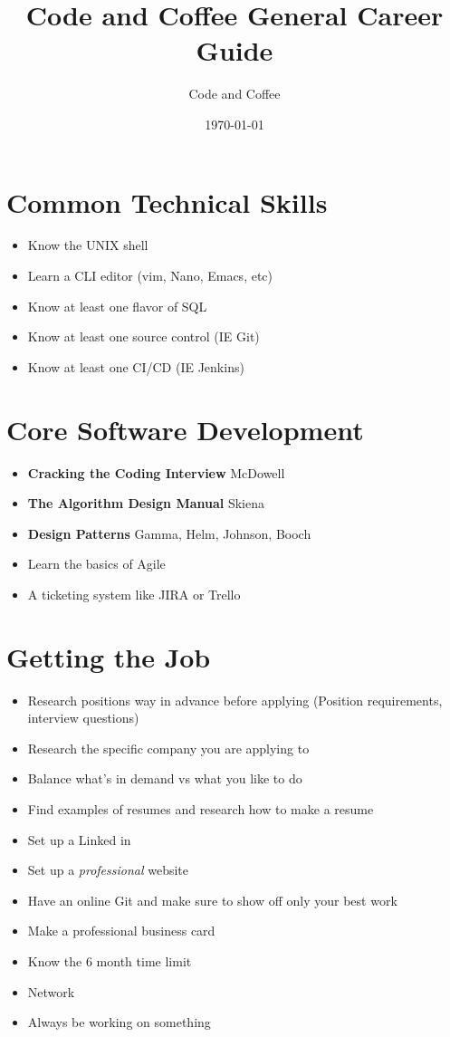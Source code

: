 \documentclass[12pt]{article}
\title{Code and Coffee General Career Guide}
\author{Code and Coffee}
\date{\today}
\begin{document}
\maketitle

\section{Common Technical Skills}
\begin{itemize}
\item Know the UNIX shell
\item Learn a CLI editor (vim, Nano, Emacs, etc)
\item Know at least one flavor of SQL
\item Know at least one source control (IE Git)
\item Know at least one CI/CD (IE Jenkins)
\end{itemize}

\section{Core Software Development}
\begin{itemize}
\item \textbf{Cracking the Coding Interview} McDowell
\item \textbf{The Algorithm Design Manual} Skiena
\item \textbf{Design Patterns} Gamma, Helm, Johnson, Booch
\item Learn the basics of Agile
\item A ticketing system like JIRA or Trello
\end{itemize}


\section{Getting the Job}
\begin{itemize}
\item Research positions way in advance before applying (Position requirements, interview questions)
\item Research the specific company you are applying to
\item Balance what's in demand vs what you like to do
\item Find examples of resumes and research how to make a resume
\item Set up a Linked in
\item Set up a \textit{professional} website
\item Have an online Git and make sure to show off only your best work
\item Make a professional business card
\item Know the 6 month time limit
\item Network
\item Always be working on something
\end{itemize}
\end{document}
